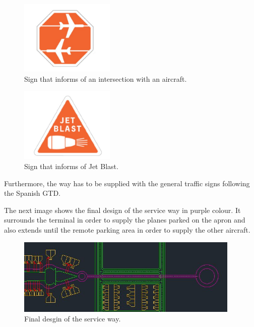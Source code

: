 	\begin{figure}[H]
		\centering
		\includegraphics[clip, trim=0cm 0cm 0cm 0cm, width=0.4\textwidth]{./images/serviceway/sign1}
		\caption{Sign that informs of an intersection with an aircraft.} %
		\label{} %
	\end{figure} 
 	
 	\begin{figure}[H]
	\centering
	\includegraphics[clip, trim=0cm 0cm 0cm 0cm, width=0.4\textwidth]{./images/serviceway/sign2}
	\caption{Sign that informs of Jet Blast.} %
	\label{} %
	\end{figure} 
	
	
	Furthermore, the way has to be supplied with the general traffic signs following the Spanish GTD. 
	
	The next image shows the final design of the service way in purple colour. It surrounds the terminal in order to supply the planes parked on the apron and also extends until the remote parking area in order to supply the other aircraft.
	
	\begin{figure}[H]
		\centering
		\includegraphics[clip, trim=0cm 0cm 0cm 0cm, angle=90, width=0.95\textwidth]{./images/serviceway/serviceway}
		\caption{Final desgin of the service way.} %
		\label{} %
	\end{figure} 
	
